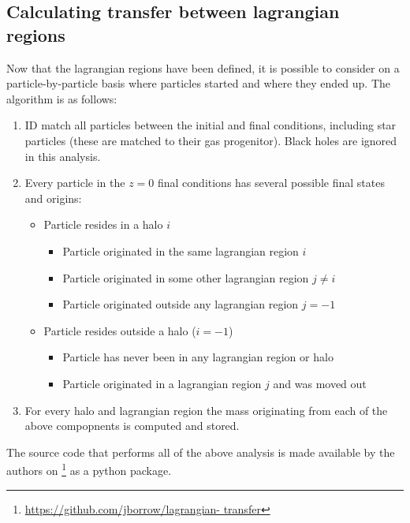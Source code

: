 \subsection{Calculating transfer between lagrangian regions}

Now that the lagrangian regions have been defined, it is possible to consider on
a particle-by-particle basis where particles started and where they ended up.
The algorithm is as follows:
\begin{enumerate}
	\item ID match all particles between the initial and final conditions, including
	      star particles (these are matched to their gas progenitor). Black holes
	      are ignored in this analysis.

	\item Every particle in the $z=0$ final conditions has several possible final
	      states and origins:
	      \begin{itemize}
	            \item Particle resides in a halo $i$
	            \begin{itemize}
	           		\item Particle originated in the same lagrangian region $i$
	           		\item Particle originated in some other lagrangian region $j \neq i$
	           		\item Particle originated outside any lagrangian region $j = -1$
	            \end{itemize}
	            \item Particle resides outside a halo ($i = -1$)
	            \begin{itemize}
	            	\item Particle has never been in any lagrangian region or halo
	            	\item Particle originated in a lagrangian region $j$ and was moved out
	            \end{itemize}
	      \end{itemize}
	      
	\item For every halo and lagrangian region the mass originating from each
	      of the above compopnents is computed and stored.
\end{enumerate}

The source code that performs all of the above analysis is made available by
the authors on \github{}\footnote{\url{https://github.com/jborrow/lagrangian-
transfer}} as a python package.


